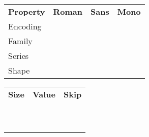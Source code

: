 \makeatletter
\newcommand\thefontsize[1]{
{\ttfamily\string#1}
& #1\let\currentsize\f@size\normalsize\currentsize
& #1\let\currentskip\f@baselineskip\normalsize\currentskip
\\
}
\makeatother
\begin{center}
\begin{tabular}{@{}lrrr@{}}
\textbf{Property} & \textbf{Roman} & \textbf{Sans} & \textbf{Mono} \\
Encoding & \rmfamily\makeatletter\detokenize\expandafter{\f@encoding}\makeatother & \sffamily\makeatletter\detokenize\expandafter{\f@encoding}\makeatother & \ttfamily\makeatletter\detokenize\expandafter{\f@encoding}\makeatother \\
Family &   \rmfamily\makeatletter\detokenize\expandafter{\f@family}\makeatother   & \sffamily\makeatletter\detokenize\expandafter{\f@family}\makeatother   & \ttfamily\makeatletter\detokenize\expandafter{\f@family}\makeatother   \\
Series &   \rmfamily\makeatletter\detokenize\expandafter{\f@series}\makeatother   & \sffamily\makeatletter\detokenize\expandafter{\f@series}\makeatother   & \ttfamily\makeatletter\detokenize\expandafter{\f@series}\makeatother   \\
Shape &    \rmfamily\makeatletter\detokenize\expandafter{\f@shape}\makeatother    & \sffamily\makeatletter\detokenize\expandafter{\f@shape}\makeatother    & \ttfamily\makeatletter\detokenize\expandafter{\f@shape}\makeatother    \\
\end{tabular}
\vspace*{1cm}
\begin{tabular}{@{}lrr@{}}
\textbf{Size} & \textbf{Value} & \textbf{Skip} \\
\thefontsize\tiny
\thefontsize\scriptsize
\thefontsize\footnotesize
\thefontsize\small
\thefontsize\normalsize
\thefontsize\large
\thefontsize\Large
\thefontsize\LARGE
\thefontsize\huge
\thefontsize\Huge
\end{tabular}
\end{center}


